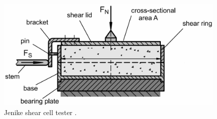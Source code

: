\begin{figure}[!htb]
\centering
\includegraphics[width=.80\columnwidth]{images/003sjsct}
\caption[Jenike shear cell tester]{Jenike shear cell tester \cite{RefWorks:69}.}
\label{fig:003sjsct}
\end{figure}